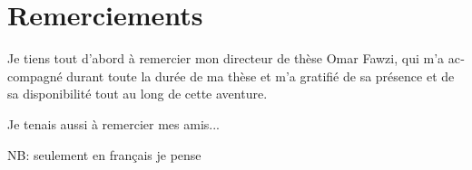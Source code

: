 \thispagestyle{empty}
\chapter*{Remerciements}


\begin{otherlanguage}{french}
  Je tiens tout d'abord à remercier mon directeur de thèse Omar Fawzi, qui m'a accompagné durant toute la durée de ma thèse et m'a gratifié de sa présence et de sa disponibilité tout au long de cette aventure.
  
  Je tenais aussi à remercier mes amis...

  NB: seulement en français je pense
\end{otherlanguage}
